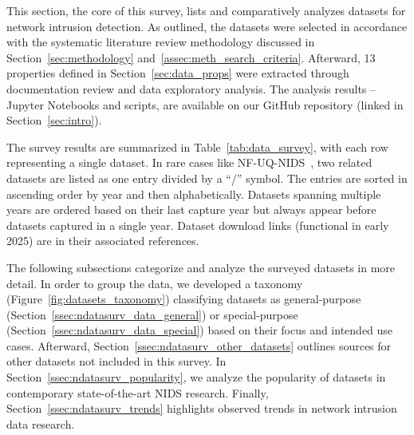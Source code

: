 This section, the core of this survey, lists and comparatively analyzes datasets for network intrusion detection. As outlined, the datasets were selected in accordance with the systematic literature review methodology discussed in Section~\ref{sec:methodology} and~\ref{assec:meth_search_criteria}. Afterward, 13 properties defined in Section~\ref{sec:data_props} were extracted through documentation review and data exploratory analysis. The analysis results -- Jupyter Notebooks and scripts, are available on our GitHub repository (linked in Section~\ref{sec:intro}).

The survey results are summarized in Table~\ref{tab:data_survey}, with each row representing a single dataset. In rare cases like NF-UQ-NIDS~\cite{sarhan2022_nids_feature_set}, two related datasets are listed as one entry divided by a ``/'' symbol. The entries are sorted in ascending order by year and then alphabetically. Datasets spanning multiple years are ordered based on their last capture year but always appear before datasets captured in a single year. Dataset download links (functional in early 2025) are in their associated references.

The following subsections categorize and analyze the surveyed datasets in more detail. In order to group the data, we developed a taxonomy (Figure~\ref{fig:datasets_taxonomy}) classifying datasets as general-purpose (Section~\ref{ssec:ndatasurv_data_general}) or special-purpose (Section~\ref{ssec:ndatasurv_data_special}) based on their focus and intended use cases. Afterward, Section~\ref{ssec:ndatasurv_other_datasets} outlines sources for other datasets not included in this survey. In Section~\ref{ssec:ndatasurv_popularity}, we analyze the popularity of datasets in contemporary state-of-the-art NIDS research. Finally, Section~\ref{ssec:ndatasurv_trends} highlights observed trends in network intrusion data research.


